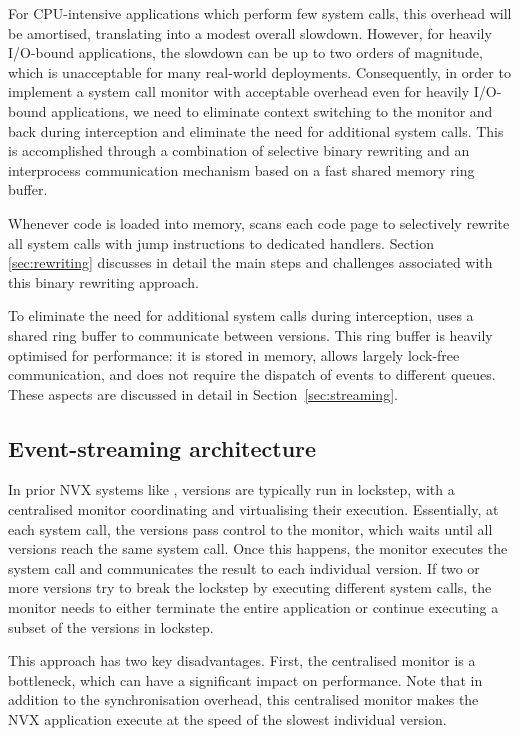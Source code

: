 For CPU-intensive applications which perform few system calls, this
overhead will be amortised, translating into a modest overall
slowdown.  However, for heavily I/O-bound applications, the slowdown
can be up to two orders of magnitude, which is unacceptable for many
real-world deployments.
%
Consequently, in order to implement a system call monitor with
acceptable overhead even for heavily I/O-bound applications, we need
to eliminate context switching to the monitor and back during
interception and eliminate the need for additional system calls.  
This is accomplished through a combination of selective binary
rewriting and an interprocess communication mechanism based on a
fast shared memory ring buffer.

Whenever code is loaded into memory, \varan scans each code page to
selectively rewrite all system calls with jump instructions to dedicated
handlers.  Section \ref{sec:rewriting} discusses in detail the main
steps and challenges associated with this binary rewriting approach.

To eliminate the need for additional system calls during interception,
\varan uses a shared ring buffer to communicate between versions.  This
ring buffer is heavily optimised for performance: it is stored in
memory, allows largely lock-free communication, and does not require
the dispatch of events to different queues.  These aspects are
discussed in detail in Section~\ref{sec:streaming}.



\subsection{Event-streaming architecture}
\label{sec:coordination}

In prior NVX systems like \mx, versions are typically run in lockstep, with a
centralised monitor coordinating and virtualising their execution.
Essentially, at each system call, the versions pass control to the monitor,
which waits until all versions reach the same system call.  Once this happens,
the monitor executes the system call and communicates the result to each
individual version.  If two or more versions try to break the lockstep by
executing different system calls, the monitor needs to either terminate the
entire application or continue executing a subset of the versions in lockstep.

This approach has two key disadvantages.  First, the centralised
monitor is a bottleneck, which can have a significant impact on
performance.  Note that in addition to the synchronisation overhead,
this centralised monitor makes the NVX application execute at the
speed of the slowest individual version.

